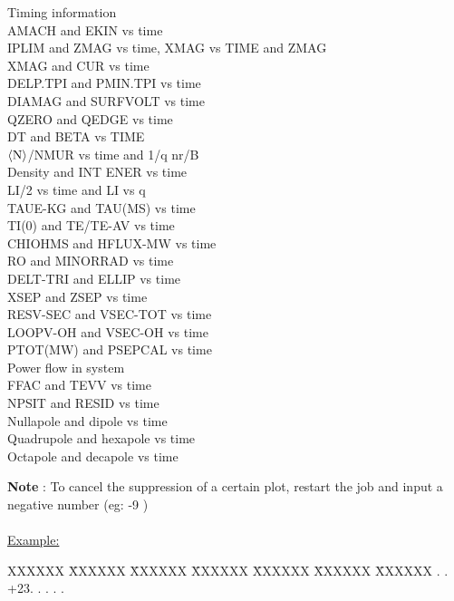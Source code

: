 \begin{tabbing}
 \> Timing information\\
 \> AMACH and EKIN vs time\\
 \> IPLIM and ZMAG vs time, XMAG vs TIME and ZMAG\\
 \> XMAG and CUR vs time\\
 \> DELP.TPI and PMIN.TPI vs time\\
 \> DIAMAG and SURFVOLT vs time\\
 \> QZERO and QEDGE vs time\\
 \> DT and BETA vs TIME\\
 \> $\langle \rm N \rangle$/NMUR vs time and 1/q nr/B\\
\>   \> Density and INT ENER vs time\\
 \> LI/2 vs time and LI vs q\\
 \> TAUE-KG and TAU(MS) vs time\\
 \> TI(0) and TE/TE-AV vs time\\
 \> CHIOHMS and HFLUX-MW vs time\\
 \> RO and MINORRAD vs time\\
 \> DELT-TRI and ELLIP vs time\\
 \> XSEP and ZSEP vs time\\
 \> RESV-SEC and VSEC-TOT vs time\\
 \> LOOPV-OH and VSEC-OH vs time\\
 \> PTOT(MW) and PSEPCAL vs time\\
\>   \> Power flow in system\\
\>   \> FFAC and TEVV vs time\\
\>   \> NPSIT and RESID vs time\\
 \> Nullapole and dipole vs time\\
 \> Quadrupole and hexapole vs time\\
 \> Octapole and decapole vs time
\end{tabbing}
{\bf Note} : To cancel the suppression of a certain plot, restart the job and input a negative number (eg: -9 ) \\
 \\
\underline{Example:}
\begin{tabbing}
XXXXXX \= XXXXXX \= XXXXXX \= XXXXXX \= XXXXXX \= XXXXXX \= XXXXXX
. . \> +23. . . . .
\end{tabbing}
\pagebreak
